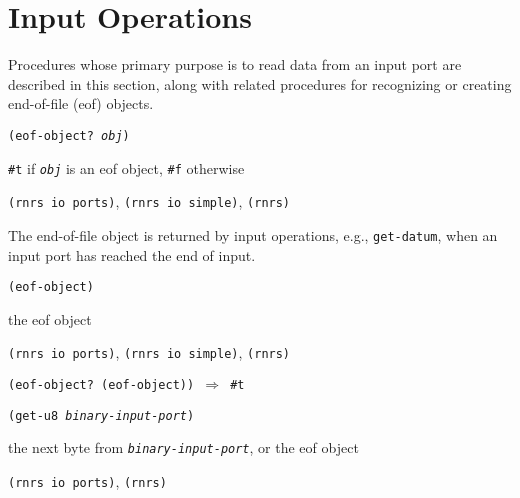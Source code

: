 \section{\label{io_g128}\label{io_h7}Input Operations\label{io_SECTINPUT}}



Procedures whose primary purpose is to read data from an input port
are described in this section, along with related procedures for recognizing
or creating end-of-file (eof) objects.


\begin{description}

\label{io_s53}\item[procedure] \texttt{(eof-object? \textit{obj})}



\item[returns] \texttt{\#{}t} if \texttt{\textit{obj}} is an eof object, \texttt{\#{}f} otherwise


\item[libraries] \texttt{(rnrs io ports)}, \texttt{(rnrs io simple)}, \texttt{(rnrs)}
\end{description}


The end-of-file object is returned by input operations, e.g., \texttt{get-datum},
when an input port has reached the end of input.


\begin{description}

\label{io_s54}\item[procedure] \texttt{(eof-object)}



\item[returns] the eof object


\item[libraries] \texttt{(rnrs io ports)}, \texttt{(rnrs io simple)}, \texttt{(rnrs)}
\end{description}


\texttt{(eof-object? (eof-object)) \(\Rightarrow\) \#{}t}
\begin{description}
\label{io_s55}\item[procedure] \texttt{(get-u8 \textit{binary-input-port})}



\item[returns] the next byte from \texttt{\textit{binary-input-port}}, or the eof object


\item[libraries] \texttt{(rnrs io ports)}, \texttt{(rnrs)}
\end{description}


